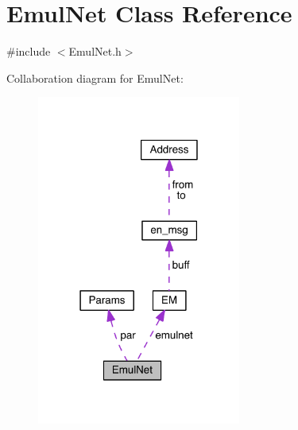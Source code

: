 \hypertarget{class_emul_net}{}\section{Emul\+Net Class Reference}
\label{class_emul_net}


{\ttfamily \#include $<$Emul\+Net.\+h$>$}



Collaboration diagram for Emul\+Net\+:\nopagebreak
\begin{figure}[H]
\begin{center}
\leavevmode
\includegraphics[width=190pt]{de/d5d/class_emul_net__coll__graph}
\end{center}
\end{figure}
